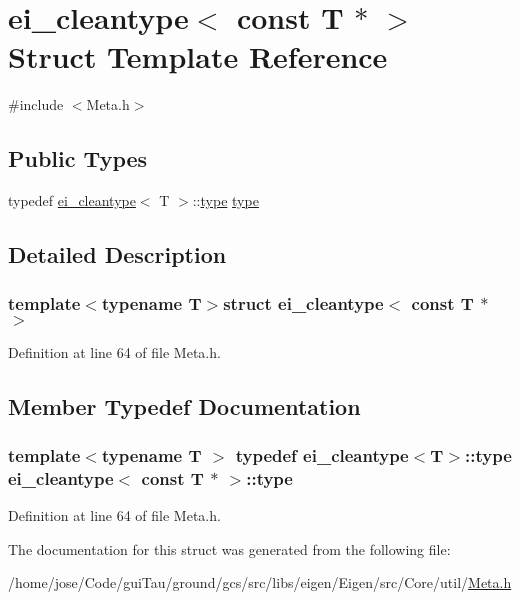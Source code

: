 \hypertarget{structei__cleantype_3_01const_01_t_01_5_01_4}{\section{ei\-\_\-cleantype$<$ const T $\ast$ $>$ Struct Template Reference}
\label{structei__cleantype_3_01const_01_t_01_5_01_4}
}


{\ttfamily \#include $<$Meta.\-h$>$}

\subsection*{Public Types}
\begin{DoxyCompactItemize}
\item 
typedef \hyperlink{structei__cleantype}{ei\-\_\-cleantype}$<$ T $>$\-::\hyperlink{structei__cleantype_3_01const_01_t_01_5_01_4_aa976c8cbd493ca4d6516504c011cf35d}{type} \hyperlink{structei__cleantype_3_01const_01_t_01_5_01_4_aa976c8cbd493ca4d6516504c011cf35d}{type}
\end{DoxyCompactItemize}


\subsection{Detailed Description}
\subsubsection*{template$<$typename T$>$struct ei\-\_\-cleantype$<$ const T $\ast$ $>$}



Definition at line 64 of file Meta.\-h.



\subsection{Member Typedef Documentation}
\hypertarget{structei__cleantype_3_01const_01_t_01_5_01_4_aa976c8cbd493ca4d6516504c011cf35d}{
\subsubsection[{type}]{\setlength{\rightskip}{0pt plus 5cm}template$<$typename T $>$ typedef {\bf ei\-\_\-cleantype}$<$T$>$\-::{\bf type} {\bf ei\-\_\-cleantype}$<$ const T $\ast$ $>$\-::{\bf type}}}\label{structei__cleantype_3_01const_01_t_01_5_01_4_aa976c8cbd493ca4d6516504c011cf35d}


Definition at line 64 of file Meta.\-h.



The documentation for this struct was generated from the following file\-:\begin{DoxyCompactItemize}
\item 
/home/jose/\-Code/gui\-Tau/ground/gcs/src/libs/eigen/\-Eigen/src/\-Core/util/\hyperlink{_meta_8h}{Meta.\-h}\end{DoxyCompactItemize}

